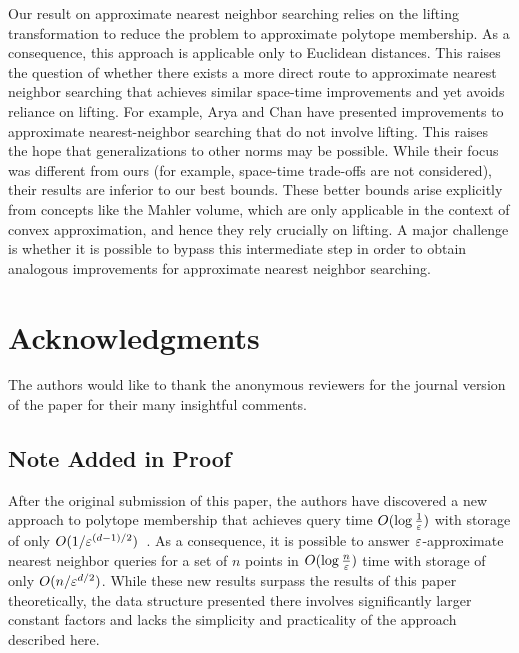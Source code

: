 \documentclass[11pt]{article}   \usepackage[letterpaper,hmargin=2.1cm,vmargin=3cm]{geometry}
\begin{document}
Our result on approximate nearest neighbor searching relies on the lifting transformation to reduce the problem to approximate polytope membership. As a consequence, this approach is applicable only to Euclidean distances. This raises the question of whether there exists a more direct route to approximate nearest neighbor searching that achieves similar space-time improvements and yet avoids reliance on lifting. For example, Arya and Chan \cite{ArC14} have presented improvements to approximate nearest-neighbor searching that do not involve lifting. This raises the hope that generalizations to other norms may be possible. While their focus was different from ours (for example, space-time trade-offs are not considered), their results are inferior to our best bounds. These better bounds arise explicitly from concepts like the Mahler volume, which are only applicable in the context of convex approximation, and hence they rely crucially on lifting. A major challenge is whether it is possible to bypass this intermediate step in order to obtain analogous improvements for approximate nearest neighbor searching.

\section{Acknowledgments}


The authors would like to thank the anonymous reviewers for the journal version of the paper for their many insightful comments.

\subsection*{Note Added in Proof}


After the original submission of this paper, the authors have discovered a new approach to polytope membership that achieves query time $O(\log \frac{1}{\varepsilon})$ with storage of only $O(1/\varepsilon^{(d-1)/2})$~\cite{AFM17}. As a consequence, it is possible to answer $\varepsilon$-approximate nearest neighbor queries for a set of $n$ points in $O(\log \frac{n}{\varepsilon})$ time with storage of only $O(n/\varepsilon^{d/2})$. While these new results surpass the results of this paper theoretically, the data structure presented there involves significantly larger constant factors and lacks the simplicity and practicality of the approach described here.





\end{document}
